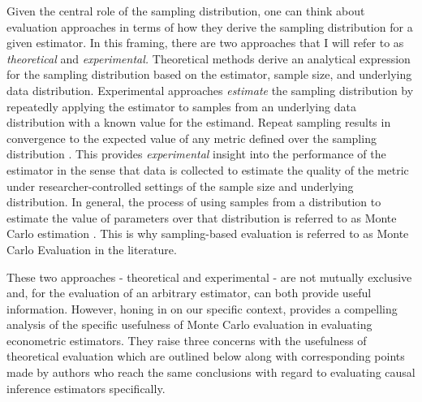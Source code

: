 \documentclass[../main.tex]{subfiles}
\begin{document}
\vspace{\baselineskip}
Given the central role of the sampling distribution, one can think about evaluation approaches in terms of how they derive the sampling distribution for a given estimator. In this framing, there are two approaches that I will refer to as \textit{theoretical} and \textit{experimental.} Theoretical methods derive an analytical expression for the sampling distribution based on the estimator, sample size, and underlying data distribution. Experimental approaches \textit{estimate }the sampling distribution by repeatedly applying the estimator to samples from an underlying data distribution with a known value for the estimand. Repeat sampling results in convergence to the expected value of any metric defined over the sampling distribution \parencite{Paxton2001MonteImplementation}. This provides \textit{experimental} insight into the performance of the estimator in the sense that data is collected to estimate the quality of the metric under researcher-controlled settings of the sample size and underlying distribution. In general, the process of using samples from a distribution to estimate the value of parameters over that distribution is referred to as Monte Carlo estimation \parencite{Hastings1970MonteApplications}. This is why sampling-based evaluation is referred to as Monte Carlo Evaluation in the literature.\par


\vspace{\baselineskip}
These two approaches - theoretical and experimental - are not mutually exclusive and, for the evaluation of an arbitrary estimator, can both provide useful information. However, honing in on our specific context, \textcite{Paxton2001MonteImplementation} provides a compelling analysis of the specific usefulness of Monte Carlo evaluation in evaluating econometric estimators. They raise three concerns with the usefulness of theoretical evaluation which are outlined below along with corresponding points made by authors who reach the same conclusions with regard to evaluating causal inference estimators specifically.\par
\end{document}
